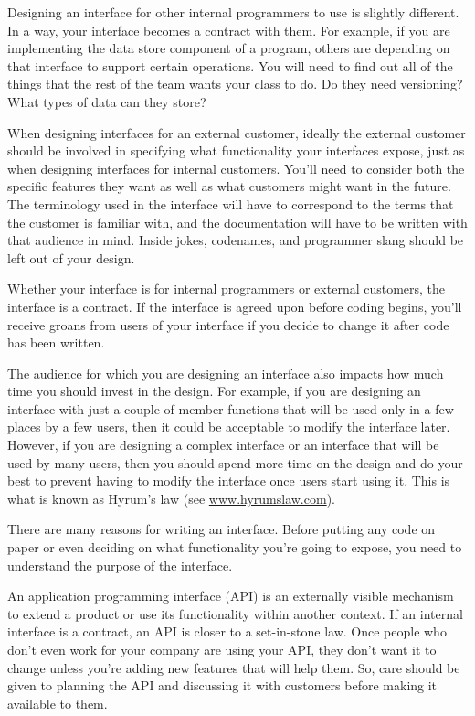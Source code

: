 Designing an interface for other internal programmers to use is slightly different. In a way, your interface becomes a contract with them. For example, if you are implementing the data store component of a program, others are depending on that interface to support certain operations. You will need to find out all of the things that the rest of the team wants your class to do. Do they need versioning? What types of data can they store?

When designing interfaces for an external customer, ideally the external customer should be involved in specifying what functionality your interfaces expose, just as when designing interfaces for internal customers. You’ll need to consider both the specific features they want as well as what customers might want in the future. The terminology used in the interface will have to correspond to the terms that the customer is familiar with, and the documentation will have to be written with that audience in mind. Inside jokes, codenames, and programmer slang should be left out of your design.

Whether your interface is for internal programmers or external customers, the interface is a contract. If the interface is agreed upon before coding begins, you’ll receive groans from users of your interface if you decide to change it after code has been written.

The audience for which you are designing an interface also impacts how much time you should invest in the design. For example, if you are designing an interface with just a couple of member functions that will be used only in a few places by a few users, then it could be acceptable to modify the interface later. However, if you are designing a complex interface or an interface that will be used by many users, then you should spend more time on the design and do your best to prevent having to modify the interface once users start using it. This is what is known as Hyrum’s law (see \url{www.hyrumslaw.com}).


There are many reasons for writing an interface. Before putting any code on paper or even deciding on what functionality you’re going to expose, you need to understand the purpose of the interface.


An application programming interface (API) is an externally visible mechanism to extend a product or use its functionality within another context. If an internal interface is a contract, an API is closer to a set-in-stone law. Once people who don’t even work for your company are using your API, they don’t want it to change unless you’re adding new features that will help them. So, care should be given to planning the API and discussing it with customers before making it available to them.

